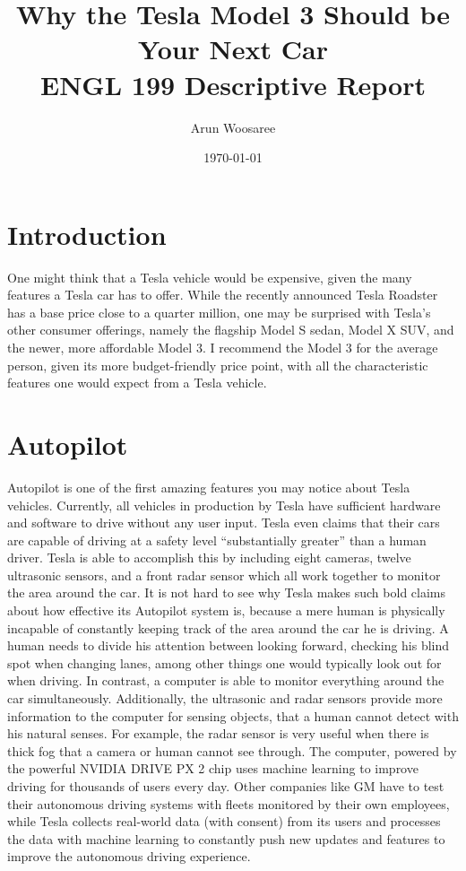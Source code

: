 \documentclass{article}
\title{Why the Tesla Model 3 Should be Your Next Car\\
\vspace{.25cm}\large ENGL 199 Descriptive Report \vspace{-.5cm}}
\author{\LARGE Arun Woosaree}
\date{\today}
\begin{document}
  \maketitle %

  \section{Introduction}
  One might think that a Tesla vehicle would be expensive, given the many
  features a Tesla car has to offer. While the recently announced Tesla Roadster
  has a base price close to a quarter million\cite{teslaroadster}, one may be
  surprised with Tesla's other consumer offerings, namely the flagship Model S sedan, Model X SUV,
  and the newer, more affordable Model 3. I recommend the Model 3 for the average person,
  given its more budget-friendly price point, with all the characteristic features
  one would expect from a Tesla vehicle.
  \newpage

  \section{Autopilot}
  Autopilot is one of the first amazing features you may notice about Tesla vehicles.
  Currently, all vehicles in production by Tesla have sufficient hardware and software to
  drive without any user input. Tesla even claims that their cars are capable of driving
  at a safety level ``substantially greater'' than a human driver\cite{allcarsautopilot}.
  Tesla is able to accomplish this by including eight cameras, twelve ultrasonic sensors, and a front radar
  sensor which all work together to monitor the area around the car. It is not hard
  to see why Tesla makes such bold claims about how effective its Autopilot system is,
  because a mere human is physically incapable of constantly keeping track of the area around
  the car he is driving. A human needs to divide his attention between looking forward,
  checking his blind spot when changing lanes, among other things one would typically
  look out for when driving. In contrast, a computer is able to monitor everything
  around the car simultaneously. Additionally, the ultrasonic and radar sensors
  provide more information to the computer for sensing objects, that a human cannot
  detect with his natural senses. For example, the radar sensor is very useful when
  there is thick fog that a camera or human cannot see through. The computer, powered
  by the powerful NVIDIA DRIVE PX 2 chip uses machine learning to improve driving for
  thousands of users every day. Other companies like GM have to test their autonomous
  driving systems with fleets monitored by their own employees, while Tesla collects
  real-world data (with consent) from its users and processes the data with machine
  learning to constantly push new updates and features to improve the autonomous
  driving experience.
  \cite{tdata1}\cite{tdata2}\cite{tdata3}
\end{document}
